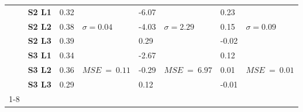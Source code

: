 \begin{table}[htb]
\begin{tabular}{@{}llllllll@{}}
           & \textbf{S2 L1} & 0.32 & \multirow{3}{*}{$\sigma = 0.04$} & -6.07 & \multirow{3}{*}{$\sigma = 2.29$}  & 0.23  & \multirow{3}{*}{$\sigma = 0.09$} \\
           & \textbf{S2 L2} & 0.38 &                       & -4.03 &                        & 0.15  &                       \\
           & \textbf{S2 L3} & 0.39 &                       & 0.29  &                        & -0.02 &                       \\
           & \textbf{S3 L1} & 0.34 & \multirow{3}{*}{$\scriptstyle{MSE}~=~0.11$} & -2.67 & \multirow{3}{*}{$\scriptstyle{MSE}~=~6.97$}  & 0.12  & \multirow{3}{*}{$\scriptstyle{MSE}~=~0.01$} \\
           & \textbf{S3 L2} & 0.36 &                       & -0.29 &                        & 0.01  &                       \\
           & \textbf{S3 L3} & 0.29 &                       & 0.12  &                        & -0.01 &                       \\ \cmidrule(r){1-8}
    \end{tabular}
\end{table}
